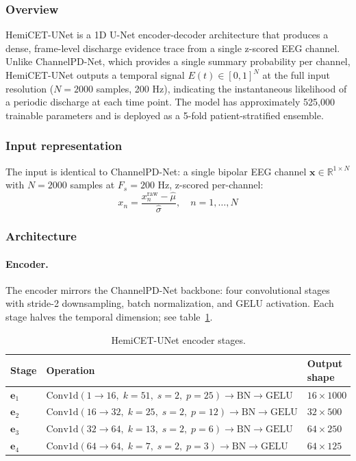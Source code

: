 \subsubsection{Overview}

HemiCET-UNet is a 1D U-Net encoder-decoder architecture that produces a dense, frame-level discharge evidence trace from a single z-scored EEG channel. Unlike ChannelPD-Net, which provides a single summary probability per channel, HemiCET-UNet outputs a temporal signal $E(t) \in [0,1]^N$ at the full input resolution ($N = 2000$ samples, 200 Hz), indicating the instantaneous likelihood of a periodic discharge at each time point. The model has approximately 525,000 trainable parameters and is deployed as a 5-fold patient-stratified ensemble.

\subsubsection{Input representation}

The input is identical to ChannelPD-Net: a single bipolar EEG channel $\mathbf{x} \in \mathbb{R}^{1 \times N}$ with $N = 2000$ samples at $F_s = 200$ Hz, z-scored per-channel:
\[ x_n = \frac{x_n^{\mathrm{raw}} - \hat{\mu}}{\hat{\sigma}}, \quad n = 1, \ldots, N \tag{1} \]

\subsubsection{Architecture}

\paragraph{Encoder.}
The encoder mirrors the ChannelPD-Net backbone: four convolutional stages with stride-2 downsampling, batch normalization, and GELU activation. Each stage halves the temporal dimension; see table~\ref{tab:hemicet_encoder}.

\begin{table}[h]
\centering
\caption{HemiCET-UNet encoder stages.}
\label{tab:hemicet_encoder}
\begin{tabular}{lll}
\hline
Stage & Operation & Output shape \\
\hline
$\mathbf{e}_1$ & $\mathrm{Conv1d}(1 \to 16,\; k{=}51,\; s{=}2,\; p{=}25) \to \mathrm{BN} \to \mathrm{GELU}$ & $16 \times 1000$ \\
$\mathbf{e}_2$ & $\mathrm{Conv1d}(16 \to 32,\; k{=}25,\; s{=}2,\; p{=}12) \to \mathrm{BN} \to \mathrm{GELU}$ & $32 \times 500$ \\
$\mathbf{e}_3$ & $\mathrm{Conv1d}(32 \to 64,\; k{=}13,\; s{=}2,\; p{=}6) \to \mathrm{BN} \to \mathrm{GELU}$ & $64 \times 250$ \\
$\mathbf{e}_4$ & $\mathrm{Conv1d}(64 \to 64,\; k{=}7,\; s{=}2,\; p{=}3) \to \mathrm{BN} \to \mathrm{GELU}$ & $64 \times 125$ \\
\hline
\end{tabular}
\end{table}

